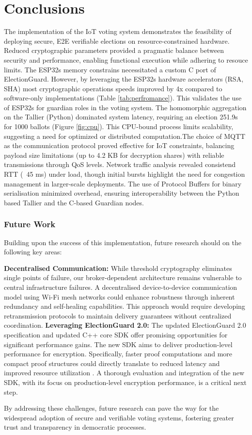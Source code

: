 \chapter{Conclusions} \label{ch:conclusions}
The implementation of the \ac{IoT} voting system demonstrates the feasibility of deploying secure, \ac{E2E} verifiable elections on resource-constrained hardware. Reduced cryptographic parameters provided a pragmatic balance between security and performance, enabling functional execution while adhering to resouce limits. The ESP32s memory constrains necessitated a custom C port of ElectionGuard. However, by leveraging the ESP32s hardware accelerators (\ac{RSA}, \ac{SHA}) most cryptographic operations speeds improved by 4x compared to software-only implementations (Table \ref{tab:perfromance}). This validates the use of ESP32s for guardian roles in the voting system. The homomorphic aggregation on the Tallier (Python) dominated system latency, requiring an election 251.9s for 1000 ballots (Figure \ref{fig:cpu}). This CPU-bound process limits scalability, suggesting a need for optimized or distributed computation.The choice of \ac{MQTT} as the communication protocol proved effective for \ac{IoT} constraints, balancing payload size limitations (up to 4.2 KB for decryption shares) with reliable transmissions through \ac{QoS} levels. Network traffic analysis revealed consistend \ac{RTT} (~45 ms) under load, though initial bursts highlight the need for congestion management in larger-scale deployments. The use of Protocol Buffers for binary serialisation minimized overhead, ensuring interoperability between the Python based Tallier and the C-based Guardian nodes.

\subsection{Future Work}
Building upon the success of this implementation, future research should on the following key areas:

\textbf{Decentralised Communication:} While threshold cryptography eliminates single points of failure, our broker-dependent architecture remains vulnerable to central infrastructure failures. A decentralised device-to-device communication model using Wi-Fi mesh networks could enhance robustness through inherent redundancy and self-healing capabilities. This approach would require developing retransmission protocols to maintain delivery guarantees without centralized coordination.
\textbf{Leveraging ElectionGuard 2.0:} The updated ElectionGuard 2.0 specification and updated C++ core SDK offer promising opportunities for significant performance gains. The new SDK aims to deliver production-level performance for encryption. Specifically, faster proof computations and more compact proof structures could directly translate to reduced latency and improved resource utilization \cite{eg-docs}. A thorough evaluation and integration of the new SDK, with its focus on production-level encryption performance, is a critical next step.

By addressing these challenges, future research can pave the way for the widespread adoption of secure and verifiable voting systems, fostering greater trust and transparency in democratic processes.




